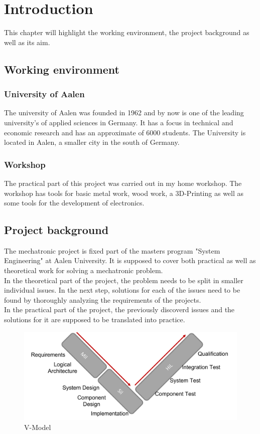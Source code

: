 \chapter{Introduction}
\label{introductio}

This chapter will highlight the working environment, the project background as well as its aim.

\section{Working environment}

\subsection{University of Aalen}
The university of Aalen was founded in 1962 and by now is one of the leading university's of applied sciences in Germany. It has a focus in technical and economic research and has an approximate of 6000 students. 
The University is located in Aalen, a smaller city in the south of Germany. 

\subsection{Workshop}
The practical part of this project was carried out in my home workshop. The workshop has tools for basic metal work, wood work, a 3D-Printing as well as some tools for the development of electronics.


\section{Project background}
The mechatronic project is fixed part of the masters program "System Engineering" at Aalen University. It is supposed to cover both practical as well as theoretical work for solving a mechatronic problem.\\
In the theoretical part of the project, the problem needs to be split in smaller individual issues. In the next step, solutions for each of the issues need to be found by thoroughly analyzing the requirements of the projects.\\
In the practical part of the project, the previously discoverd issues and the solutions for it are supposed to be translated into practice. 
\begin{figure}[h!]
    \begin{center}
    \includegraphics[width=12cm]{Pictures/VModelComplete.png}
    \caption[V-Model Complete]{V-Model}
    \label{V-Model Complete}
    \end{center}
\end{figure}

